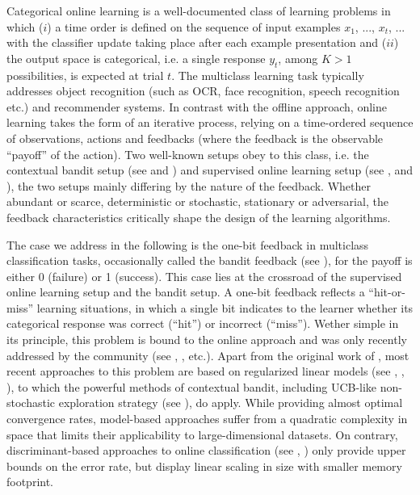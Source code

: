 \documentclass[preprint,12pt,authoryear]{elsarticle}
\begin{document}
Categorical online learning is a well-documented class of learning problems in which ($i$) a time order is defined on the sequence of input examples  $x_1$, ..., $x_t$, ... with the classifier update taking place after each example presentation and ($ii$) the output space is categorical, i.e. a single response $y_t$, among $K>1$ possibilities, is expected at trial $t$. The multiclass learning task typically addresses object recognition (such as OCR, face recognition, speech recognition etc.) and recommender systems. In contrast with the offline approach, online learning takes the form of an iterative process, relying on a time-ordered sequence of observations, actions and feedbacks (where the feedback is the observable ``payoff'' of the action).   
Two well-known setups obey to this class, i.e. the contextual bandit setup (see  \cite{lai1985asymptotically} and \cite{auer2002finite}) and supervised online learning setup (see  \cite{rosenblatt1958perceptron}, \cite{duda1973pattern} and \cite{freund1999large}), the two setups mainly differing by the nature of the feedback. Whether abundant or scarce, deterministic or stochastic, stationary or adversarial, the feedback characteristics critically shape the design of the learning algorithms.  

The case we address in the following is the one-bit feedback in multiclass classification tasks, occasionally called the bandit feedback (see \cite{kakade2008efficient}), for the payoff is either 0 (failure) or 1 (success). This case lies at the crossroad of the supervised online learning setup and the bandit setup.  A one-bit feedback reflects a ``hit-or-miss'' learning situations, in which a single bit indicates to the learner whether its categorical response was correct (``hit'') or incorrect (``miss''). Wether simple in its principle, this problem is bound to the online approach and was only recently addressed by the community (see \cite{kakade2008efficient}, \cite{gentile2012multilabel}, etc.). 
Apart from the original work of \cite{kakade2008efficient}, most recent approaches to this problem are based on regularized linear models (see \cite{li2010contextual}, \cite{crammer2013multiclass}, \cite{ngo2013upper}), to which the powerful methods of contextual bandit, including UCB-like non-stochastic exploration strategy (see \cite{lai1985asymptotically}), do apply. While providing almost optimal convergence rates, model-based approaches suffer from a quadratic complexity in space that limits their applicability to large-dimensional datasets.  On contrary, discriminant-based approaches to online classification (see \cite{anlauf1989adatron}, \cite{crammer2006online}) only provide upper bounds on the error rate, but display linear scaling in size with smaller memory footprint. 
\end{document}
